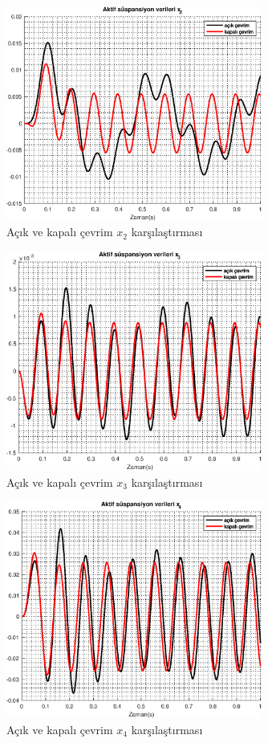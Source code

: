 \begin{figure}[!htb]
    \centering
    \includegraphics[width=0.75\textwidth]{plot3}
    \caption{Açık ve kapalı çevrim $x_2$ karşılaştırması}
\end{figure}

\begin{figure}[!htb]
    \centering
    \includegraphics[width=0.75\textwidth]{plot4}
    \caption{Açık ve kapalı çevrim $x_3$ karşılaştırması}
\end{figure}

\begin{figure}[!htb]
    \centering
    \includegraphics[width=0.75\textwidth]{plot5}
    \caption{Açık ve kapalı çevrim $x_4$ karşılaştırması}
\end{figure}
